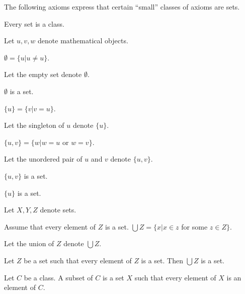 \documentclass[english,11pt]{article}
\begin{document}
The following axioms express that certain ``small'' classes of axioms are sets.

\newcommand{\sing}[1]{\{#1\}}
\newcommand{\unp}[2]{\{#1,#2\}}

\begin{forthel}

\begin{proposition} Every set is a class. \end{proposition}

Let $u,v,w$ denote mathematical objects.

\begin{definition} $\emptyset = \{u | u \neq u\}$.
\end{definition}
Let the empty set denote $\emptyset$.

\begin{axiom}[title = Set Existence] $\emptyset$ is a set. \end{axiom}

\begin{definition}
$\sing{u} = \{v | v = u\}$.
\end{definition}
Let the singleton of $u$ denote $\sing{u}$.


\begin{definition}
$\unp{u}{v} = \{w | w = u$ or $w = v\}$.
\end{definition}
Let the unordered pair of $u$ and $v$ denote $\unp{u}{v}$.

\begin{axiom}[title = Pairs]
$\unp{u}{v}$ is a set.
\end{axiom}

\begin{lemma}
$\sing{u}$ is a set.
\end{lemma}

Let $X,Y,Z$ denote sets.

\begin{definition} Assume that every element of $Z$ is a set.
$\bigcup Z = \{x | x \in z$ for some $z \in Z\}$.
\end{definition}
Let the union of $Z$ denote $\bigcup Z$.

\begin{axiom}[title = Union] 
Let $Z$ be a set such that every element of $Z$ is a set.
Then $\bigcup Z$ is a set.
\end{axiom}

\begin{definition} Let $C$ be a class. A subset of $C$ is a set $X$ such
that every element of $X$ is an element of $C$.
\end{definition}


\end{forthel}
\end{document}
